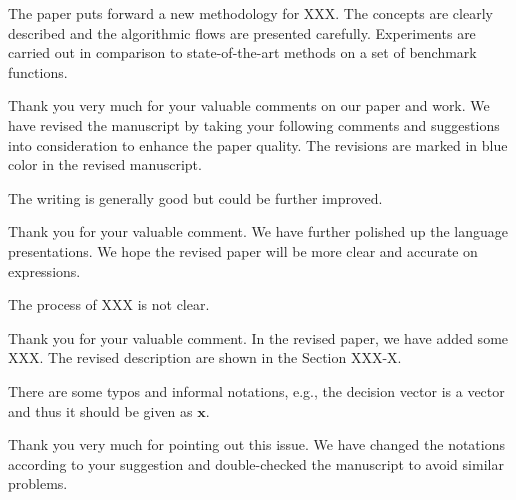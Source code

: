 \begin{Reviewer}

  \begin{CommentSummary}
    The paper puts forward a new methodology for XXX.
    The concepts are clearly described and the algorithmic flows are presented carefully.
    Experiments are carried out in comparison to state-of-the-art methods on a set of benchmark functions.
  \end{CommentSummary}
  \begin{Response}
    Thank you very much for your valuable comments on our paper and work.
    We have revised the manuscript by taking your following comments and suggestions into consideration to enhance the paper quality.
    The revisions are marked in {\color{blue}blue} color in the revised manuscript. 
  \end{Response}

  \begin{ReviewerComment}
    The writing is generally good but could be further improved.
  \end{ReviewerComment}
  
  \begin{Response}
    Thank you for your valuable comment.
    We have further polished up the language presentations.
    We hope the revised paper will be more clear and accurate on expressions.
  \end{Response}

  \begin{ReviewerComment}
    The process of XXX is not clear.
  \end{ReviewerComment}
  
  \begin{Response}
    Thank you for your valuable comment. 
    In the revised paper, we have added some XXX.
    The revised description are shown in the Section XXX-X. 
  \end{Response}

  \begin{ReviewerComment}
    There are some typos and informal notations, e.g., the decision vector is a vector and thus it should be given as $\mathbf{x}$.
  \end{ReviewerComment}
  \begin{Response}
    Thank you very much for pointing out this issue.
    We have changed the notations according to your suggestion and double-checked the manuscript to avoid similar problems. 
  \end{Response}



\end{Reviewer}
